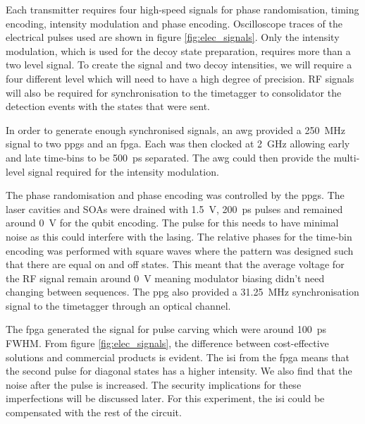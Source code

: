 
Each transmitter requires four high-speed signals for phase randomisation, timing encoding, intensity modulation and phase encoding. Oscilloscope traces of the electrical pulses used are shown in figure \ref{fig:elec_signals}. Only the intensity modulation, which is used for the decoy state preparation, requires more than a two level signal. To create the signal and two decoy intensities, we will require a four different level which will need to have a high degree of precision. RF signals will also be required for synchronisation to the timetagger to consolidator the detection events with the states that were sent. 


In order to generate enough synchronised signals, an \ac{awg} provided a \SI{250}{\MHz} signal to two \acp{ppg} and an \ac{fpga}. Each was then clocked at \SI{2}{GHz} allowing early and late time-bins to be \SI{500}{ps} separated. The \ac{awg} could then provide the multi-level signal required for the intensity modulation.

The phase randomisation and phase encoding was controlled by the \acp{ppg}. The laser cavities and \acp{SOA} were drained with \SI{1.5}{\V}, \SI{200}{ps} pulses and remained around \SI{0}{\V} for the qubit encoding. The pulse for this needs to have minimal noise as this could interfere with the lasing. The relative phases for the time-bin encoding was performed with square waves where the pattern was designed such that there are equal on and off states. This meant that the average voltage for the RF signal remain around \SI{0}{\V} meaning modulator biasing didn't need changing between sequences. The \ac{ppg} also provided a \SI{31.25}{MHz} synchronisation signal to the timetagger through an optical channel. 

The \ac{fpga} generated the signal for pulse carving which were around \SI{100}{ps} \ac{FWHM}. From figure \ref{fig:elec_signals}, the difference between cost-effective solutions and commercial products is evident. The \ac{isi} from the \ac{fpga} means that the second pulse for diagonal states has a higher intensity. We also find that the noise after the pulse is increased. The security implications for these imperfections will be discussed later. For this experiment, the \ac{isi} could be compensated with the rest of the circuit.  

